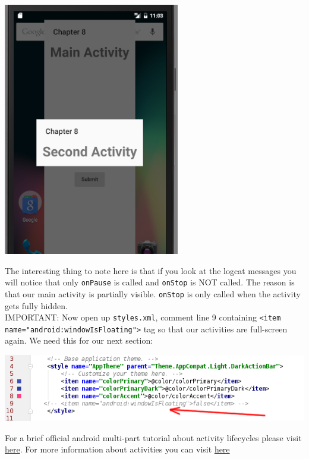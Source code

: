 \begin{center}
	\includegraphics[scale=0.4]{chapters/ch08/images/14}
\end{center}

The interesting thing to note here is that if you look at the logcat messages you will notice that only \texttt{onPause} is called and \texttt{onStop} is NOT called. The reason is that our main activity is partially visible. \texttt{onStop} is only called when the activity gets fully hidden. \\

IMPORTANT: Now open up \texttt{styles.xml}, comment line 9 containing \texttt{<item name="android:windowIsFloating">} tag so that our activities are full-screen again. We need this for our next section:

\begin{center}
	\includegraphics[scale=0.4]{chapters/ch08/images/16}
\end{center}

For a brief official android multi-part tutorial about activity lifecycles please visit \href{https://developer.android.com/training/basics/activity-lifecycle/starting.html}{here}. For more information about activities you can visit \href{https://developer.android.com/guide/components/activities.html}{here}

